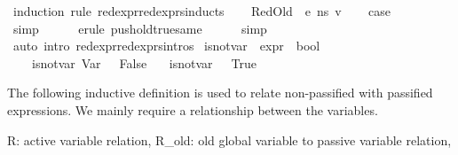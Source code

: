 \begin{isabellebody}
%
\isadelimproof
%
\endisadelimproof
%
\isatagproof
{}\isamarkupfalse%
\ {\isacharparenleft}{\kern0pt}induction\ rule{\isacharcolon}{\kern0pt}\ red{\isacharunderscore}{\kern0pt}expr{\isacharunderscore}{\kern0pt}red{\isacharunderscore}{\kern0pt}exprs{\isachardot}{\kern0pt}inducts{\isacharparenright}{\kern0pt}\isanewline
\ \ \isamarkupfalse%
\ {\isacharparenleft}{\kern0pt}RedOld\ {\isasymOmega}\ e\ n{\isacharunderscore}{\kern0pt}s\ v{\isacharparenright}{\kern0pt}\isanewline
\ \ \isamarkupfalse%
\ {\isacharquery}{\kern0pt}case\ \isanewline
\ \ \ \ \isamarkupfalse%
\ simp\isanewline
\ \ \ \ \isamarkupfalse%
\ {\isacharparenleft}{\kern0pt}erule\ push{\isacharunderscore}{\kern0pt}old{\isacharunderscore}{\kern0pt}true{\isacharunderscore}{\kern0pt}same{\isacharparenright}{\kern0pt}\isanewline
\ \ \ \ \isamarkupfalse%
\ simp\isanewline
{}\isamarkupfalse%
\ {\isacharparenleft}{\kern0pt}auto\ intro{\isacharcolon}{\kern0pt}\ red{\isacharunderscore}{\kern0pt}expr{\isacharunderscore}{\kern0pt}red{\isacharunderscore}{\kern0pt}exprs{\isachardot}{\kern0pt}intros{\isacharparenright}{\kern0pt}%
\endisatagproof
{\isafoldproof}%
%
\isadelimproof
\isanewline
%
\endisadelimproof
\isanewline
{}\isamarkupfalse%
\isanewline
\isanewline
\isanewline
{}\isamarkupfalse%
\ is{\isacharunderscore}{\kern0pt}not{\isacharunderscore}{\kern0pt}var\ {\isacharcolon}{\kern0pt}{\isacharcolon}{\kern0pt}\ {\isachardoublequoteopen}expr\ {\isasymRightarrow}\ bool{\isachardoublequoteclose}\isanewline
\ \ \ \isanewline
\ \ \ \ {\isachardoublequoteopen}is{\isacharunderscore}{\kern0pt}not{\isacharunderscore}{\kern0pt}var\ {\isacharparenleft}{\kern0pt}Var\ {\isacharunderscore}{\kern0pt}{\isacharparenright}{\kern0pt}\ {\isacharequal}{\kern0pt}\ False{\isachardoublequoteclose}\isanewline
\ \ {\isacharbar}{\kern0pt}\ {\isachardoublequoteopen}is{\isacharunderscore}{\kern0pt}not{\isacharunderscore}{\kern0pt}var\ {\isacharunderscore}{\kern0pt}\ {\isacharequal}{\kern0pt}\ True{\isachardoublequoteclose}%
\begin{isamarkuptext}%
The following inductive definition is used to relate non-passified with passified expressions.
We mainly require a relationship between the variables.%
\end{isamarkuptext}\isamarkuptrue%
%
\begin{isamarkuptext}%
R: active variable relation, 
       R_old: old global variable to passive variable relation, 

\end{isamarkuptext}
\end{isabellebody}
